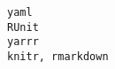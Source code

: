 \documentclass[
  letterpaper,
  DIV=11,
  numbers=noendperiod]{scrreprt}
\begin{document}
\begin{verbatim}
yaml                                                                                                                                                                                                                                                                                                                                                                                                                                                                                                                                                                                                                                                                                                                                                                                                                                                                                                                                                                                                                                                                                                                                                                                                                                                                                                    RUnit
yarrr                                                                                                                                                                                                                                                                                                                                                                                                                                                                                                                                                                                                                                                                                                                                                                                                                                                                                                                                                                                                                                                                                                                                                                                                                                                                                        knitr, rmarkdown

\end{verbatim}
\end{document}
